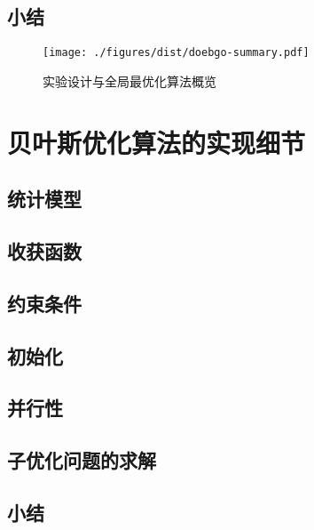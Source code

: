 \documentclass[index]{subfiles}
\begin{document}
\subsection{小结}
\begin{figure}[h]
  \centering
  \texttt{[image: ./figures/dist/doebgo-summary.pdf]}
  \caption{实验设计与全局最优化算法概览\label{fig:doebgo-summary}}
\end{figure}
\section{贝叶斯优化算法的实现细节}
\subsection{统计模型}\label{ssec:bgo-mdl}
\subsection{收获函数}
\subsection{约束条件}
\subsection{初始化}\label{ssec:bgo-init}
\subsection{并行性}
\subsection{子优化问题的求解}\label{ssec:bgo-sub}
\subsection{小结}
\end{document}

